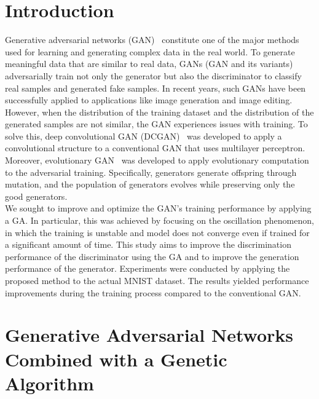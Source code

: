 \section{Introduction}
\label{sec:introduction}
Generative adversarial networks (GAN)~\cite{DBLP:conf/nips/GoodfellowPMXWOCB14} constitute one of the major methods used for learning and generating complex data in the real world. To generate meaningful data that are similar to real data, GANs (GAN and its variants) adversarially train not only the generator but also the discriminator to classify real samples and generated fake samples. In recent years, such GANs have been successfully applied to applications like image generation and image editing.\\
However, when the distribution of the training dataset and the distribution of the generated samples are not similar, the GAN experiences issues with training. To solve this, deep convolutional GAN (DCGAN)~\cite{DBLP:journals/corr/RadfordMC15} was developed to apply a convolutional structure to a conventional GAN that uses multilayer perceptron. Moreover, evolutionary GAN~\cite{DBLP:journals/corr/abs-1803-00657} was developed to apply evolutionary computation to the adversarial training. Specifically, generators generate offspring through mutation, and the population of generators evolves while preserving only the good generators.\\
We sought to improve and optimize the GAN’s training performance by applying a GA. In particular, this was achieved by focusing on the oscillation phenomenon, in which the training is unstable and model does not converge even if trained for a significant amount of time. This study aims to improve the discrimination performance of the discriminator using the GA and to improve the generation performance of the generator. Experiments were conducted by applying the proposed method to the actual MNIST dataset. The results yielded performance improvements during the training process compared to the conventional GAN.


\section{Generative Adversarial Networks Combined with a Genetic Algorithm}
